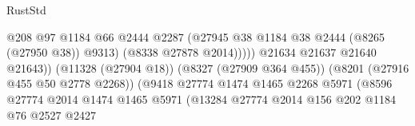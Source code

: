 \begin{lexlean}{RustStd}
\begin{coremodule}
                                                            @208
                                                            @97
                                                            @1184
                                                            @66
                                                            @2444
                                                            @2287
                                                            (@27945
                                                              @38
                                                              @1184
                                                              @38
                                                              @2444
                                                              (@8265 (@27950 @38))
                                                              @9313)
                                                            (@8338 @27878 @2014)))))
                                                    @21634
                                                    @21637
                                                    @21640
                                                    @21643))
                                                (@11328 (@27904 @18))
                                                (@8327 (@27909 @364 @455))
                                                (@8201 (@27916 @455 @50 @2778 @2268))
                                                (@9418
                                                  @27774
                                                  @1474
                                                  @1465
                                                  @2268
                                                  @5971
                                                  (@8596
                                                    @27774
                                                    @2014
                                                    @1474
                                                    @1465
                                                    @5971
                                                    (@13284
                                                      @27774
                                                      @2014
                                                      @156
                                                      @202
                                                      @1184
                                                      @76
                                                      @2527
                                                      @2427

\end{coremodule}
\end{lexlean}
